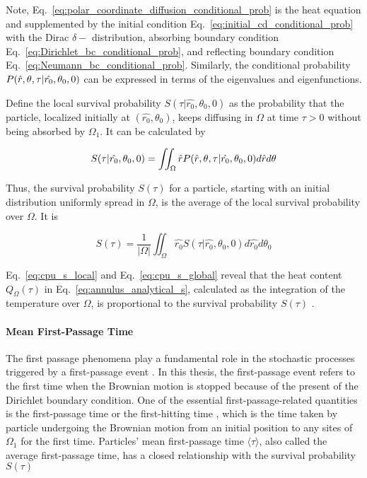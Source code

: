 Note, Eq.~\ref{eq:polar_coordinate_diffusion_conditional_prob} is the
heat equation and supplemented by the initial condition
Eq.~\ref{eq:initial_cd_conditional_prob} with the Dirac $\delta -$
distribution, absorbing boundary condition
Eq.~\ref{eq:Dirichlet_bc_conditional_prob}, and reflecting boundary
condition Eq.~\ref{eq:Neumann_bc_conditional_prob}. Similarly, the
conditional probability $P(\hat r, \theta, \tau | \hat{r_0}, \theta_0, 0)$ can be expressed in terms of the
eigenvalues and eigenfunctions. 

Define the local survival probability $S(\tau | \hat{r_0}, \theta_0,
0)$ as the probability that the particle, localized initially at
$(\hat{r_0}, \theta_0)$, keeps diffusing in $\Omega$ at time $\tau >
0$ without being absorbed by $\Omega_1$. It can be calculated by


\begin{equation}\label{eq:cpu_s_local}
  S(\tau | \hat{r_0}, \theta_0, 0) = \iint_{\Omega} \hat r P(\hat r, \theta, \tau | \hat{r_0}, \theta_0, 0) d \hat r d\theta
\end{equation}
  
Thus, the survival probability $S(\tau)$ for a particle, starting with
an initial distribution uniformly spread in $\Omega$, is the average
of the local survival probability over $\Omega$. It is

\begin{equation}\label{eq:cpu_s_global}
  S(\tau) = \frac{1}{|\Omega|}\iint_{\Omega} \hat{r_0} S(\tau | \hat{r_0}, \theta_0, 0) d \hat{r_0} d \theta_0
\end{equation}

Eq.~\ref{eq:cpu_s_local} and Eq.~\ref{eq:cpu_s_global} reveal that the
heat content $Q_{\Omega}(\tau)$ in Eq.~\ref{eq:annulus_analytical_s},
calculated as the integration of the temperature over $\Omega$, is
proportional to the survival probability
$S(\tau)$ \cite{kalinay2011survival}. 


\paragraph{Mean First-Passage Time}

The first passage phenomena play a fundamental role in the stochastic
processes triggered by a first-passage
event \cite{van1992stochastic}. In this thesis, the first-passage
event refers to the first time when the Brownian motion is stopped
because of the present of the Dirichlet boundary condition. One of the
essential first-passage-related quantities is the first-passage time
or the first-hitting time \cite{redner2001guide}, which is the time
taken by particle undergoing the Brownian motion from an initial
position to any sites of $\Omega_1$ for the first time. Particles'
mean first-passage time $\langle \tau \rangle$, also called the
average first-passage time, has a closed relationship with the
survival probability $S(\tau)$ \cite{redner2001guide}

